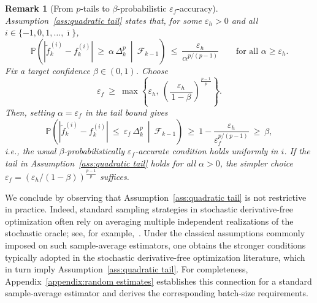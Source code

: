 \documentclass[11pt,a4paper]{article}
\newtheorem{remark}{Remark}[section]
\newcommand{\Imax}{\bar{\imath}}%
\newcommand{\Dexp}{p}
\newcommand{\aexp}{\Dexp/(\Dexp-1)}
\begin{document}
\begin{remark}[From $\Dexp$-tails to $\beta$-probabilistic $\varepsilon_f$-accuracy]
\label{rem:A4-to-BPE}
Assumption~\ref{ass:quadratic tail} states that, for some $\varepsilon_h>0$ and all
$i\in\{-1,0,1,\dots, \Imax\}$,
\[
\mathbb P\!\left(|\tilde f_k^{(i)}-f_k^{(i)}|\ \ge\ \alpha\,\Delta_k^{\Dexp}\ \middle|\ \mathcal F_{k-1}\right)
\ \le\ \frac{\varepsilon_h}{\alpha^{\aexp}}\qquad\text{for all }\alpha\ge \varepsilon_h.
\]
Fix a target confidence $\beta\in(0,1)$. Choose
\[
\varepsilon_f\ \ge\ \max\!\left\{\varepsilon_h,\ \left(\frac{\varepsilon_h}{\,1-\beta\,}\right)^{\frac{\Dexp-1}{\Dexp}}\right\}.
\]
Then, setting $\alpha=\varepsilon_f$ in the tail bound gives
\[
\mathbb P\!\left(|\tilde f_k^{(i)}-f_k^{(i)}|\ \le\ \varepsilon_f\,\Delta_k^{\Dexp}\ \middle|\ \mathcal F_{k-1}\right)
\ \ge\ 1-\frac{\varepsilon_h}{\varepsilon_f^{\aexp}}\ \ge\ \beta,
\]
i.e., the usual $\beta$-probabilistically $\varepsilon_f$-accurate condition holds uniformly in $i$. If the tail in Assumption~\ref{ass:quadratic tail} holds for all $\alpha>0$, the simpler choice
$\varepsilon_f=(\varepsilon_h/(1-\beta))^{\frac{\Dexp-1}{\Dexp}}$ suffices.
\end{remark}
We conclude by observing that Assumption~\ref{ass:quadratic tail} is not restrictive in practice. Indeed, standard sampling strategies in stochastic derivative-free optimization often rely on averaging multiple independent realizations of the stochastic oracle; see, for example,~\cite{MR4238147,MR3800867,MR3880261}. Under the classical assumptions commonly imposed on such sample-average estimators, one obtains the stronger  conditions typically adopted in the stochastic derivative-free optimization literature, which in turn imply Assumption~\ref{ass:quadratic tail}. For completeness, Appendix~\ref{appendix:random estimates} establishes this connection for a standard sample-average estimator and derives the corresponding batch-size requirements.
\end{document}
